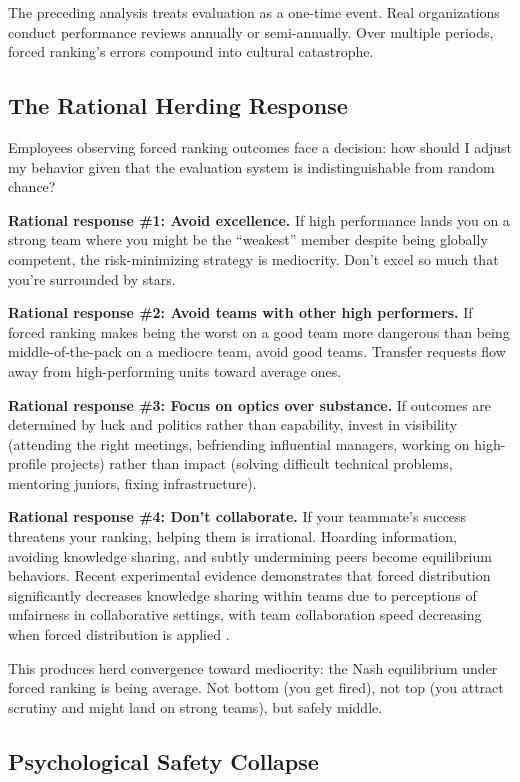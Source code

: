 \documentclass[12pt]{article}
\begin{document}
The preceding analysis treats evaluation as a one-time event. Real organizations conduct performance reviews annually or semi-annually. Over multiple periods, forced ranking's errors compound into cultural catastrophe.

\subsection{The Rational Herding Response}

Employees observing forced ranking outcomes face a decision: how should I adjust my behavior given that the evaluation system is indistinguishable from random chance?

\textbf{Rational response \#1: Avoid excellence.} If high performance lands you on a strong team where you might be the ``weakest'' member despite being globally competent, the risk-minimizing strategy is mediocrity. Don't excel so much that you're surrounded by stars.

\textbf{Rational response \#2: Avoid teams with other high performers.} If forced ranking makes being the worst on a good team more dangerous than being middle-of-the-pack on a mediocre team, avoid good teams. Transfer requests flow away from high-performing units toward average ones.

\textbf{Rational response \#3: Focus on optics over substance.} If outcomes are determined by luck and politics rather than capability, invest in visibility (attending the right meetings, befriending influential managers, working on high-profile projects) rather than impact (solving difficult technical problems, mentoring juniors, fixing infrastructure).

\textbf{Rational response \#4: Don't collaborate.} If your teammate's success threatens your ranking, helping them is irrational. Hoarding information, avoiding knowledge sharing, and subtly undermining peers become equilibrium behaviors. Recent experimental evidence demonstrates that forced distribution significantly decreases knowledge sharing within teams due to perceptions of unfairness in collaborative settings, with team collaboration speed decreasing when forced distribution is applied \citep{loberg2021forced}.

This produces herd convergence toward mediocrity: the Nash equilibrium under forced ranking is being average. Not bottom (you get fired), not top (you attract scrutiny and might land on strong teams), but safely middle.

\subsection{Psychological Safety Collapse}
\end{document}
